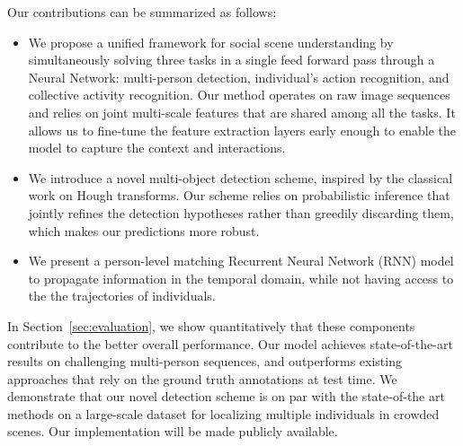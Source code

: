 \documentclass[10pt,twocolumn,letterpaper]{article}
\begin{document}
Our contributions can be summarized as follows:

\begin{itemize}
\setlength\itemsep{0cm}
\item We propose a unified framework for social scene understanding by simultaneously
solving three tasks in a single feed forward pass through a Neural Network: multi-person
detection, individual's action recognition, and collective activity recognition.  
Our method operates on raw image sequences and relies on joint multi-scale features 
that are shared among all the tasks. 
It allows us to fine-tune the feature extraction layers early enough to enable the model to capture the context and interactions.
\item We introduce a novel multi-object detection scheme, inspired by the classical
work on Hough transforms. Our scheme relies on probabilistic inference that jointly
refines the detection hypotheses rather than greedily discarding them, which makes
our predictions more robust.
\item We present a person-level matching Recurrent Neural Network (RNN) model to
propagate information in the temporal domain, while not having access to the the
trajectories of individuals.
\end{itemize}

In Section~\ref{sec:evaluation}, we show quantitatively that these
components contribute to the better overall performance. Our model achieves
state-of-the-art results on challenging multi-person sequences, and 
outperforms existing approaches that rely on the ground truth annotations at
test time. We demonstrate that our novel detection scheme is on par with the 
state-of-the art methods on a large-scale dataset for localizing multiple 
individuals in crowded scenes. Our implementation will be made publicly available.
\end{document}
